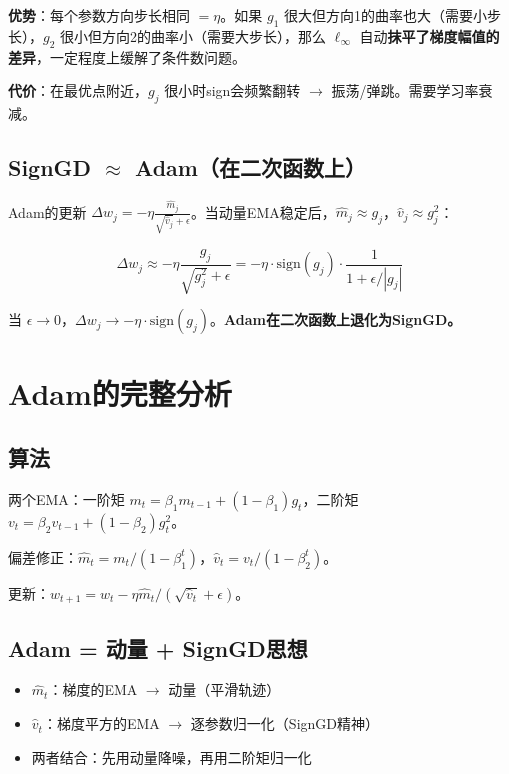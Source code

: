 \documentclass[12pt,a4paper]{article}
\begin{document}
\textbf{优势}：每个参数方向步长相同 $= \eta$。如果 $g_1$ 很大但方向1的曲率也大（需要小步长），$g_2$ 很小但方向2的曲率小（需要大步长），那么 $\ell_\infty$ 自动\textbf{抹平了梯度幅值的差异}，一定程度上缓解了条件数问题。

\textbf{代价}：在最优点附近，$g_j$ 很小时sign会频繁翻转 $\to$ 振荡/弹跳。需要学习率衰减。


\subsection{SignGD $\approx$ Adam（在二次函数上）}

Adam的更新 $\Delta w_j = -\eta \frac{\hat{m}_j}{\sqrt{\hat{v}_j}+\epsilon}$。当动量EMA稳定后，$\hat{m}_j \approx g_j$，$\hat{v}_j \approx g_j^2$：


\[\Delta w_j \approx -\eta \frac{g_j}{\sqrt{g_j^2}+\epsilon} = -\eta \cdot \text{sign}(g_j) \cdot \frac{1}{1+\epsilon/|g_j|}\]

当 $\epsilon \to 0$，$\Delta w_j \to -\eta \cdot \text{sign}(g_j)$。\textbf{Adam在二次函数上退化为SignGD。}




\section{Adam的完整分析}


\subsection{算法}

两个EMA：一阶矩 $m_t = \beta_1 m_{t-1} + (1-\beta_1)g_t$，二阶矩 $v_t = \beta_2 v_{t-1} + (1-\beta_2)g_t^2$。

偏差修正：$\hat{m}_t = m_t/(1-\beta_1^t)$，$\hat{v}_t = v_t/(1-\beta_2^t)$。

更新：$w_{t+1} = w_t - \eta \hat{m}_t / (\sqrt{\hat{v}_t}+\epsilon)$。


\subsection{Adam = 动量 + SignGD思想}

\begin{itemize}[leftmargin=*,nosep]
\item $\hat{m}_t$：梯度的EMA $\to$ 动量（平滑轨迹）
\item $\hat{v}_t$：梯度平方的EMA $\to$ 逐参数归一化（SignGD精神）
\item 两者结合：先用动量降噪，再用二阶矩归一化
\end{itemize}
\end{document}
